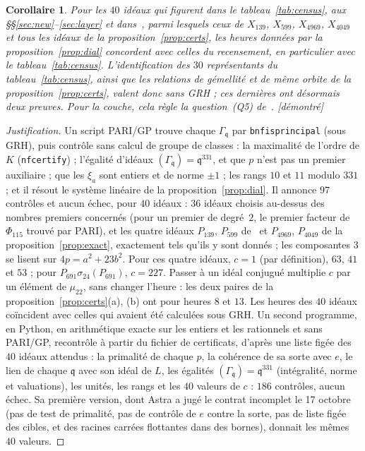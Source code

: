 \documentclass[11pt,a4paper]{amsart}
\theoremstyle{plain}
\newtheorem{corollary}[proposition]{Corollaire}
\theoremstyle{definition}
\newcommand{\q}{\mathfrak{q}}
\newcommand{\st}[1]{\textup{\textsf{\small[#1]}}}
\newcommand{\DEM}{\st{démontré}}
\begin{document}
\begin{corollary}\label{cor:dial}
Pour les $40$ idéaux qui figurent dans le tableau~\ref{tab:census}, aux \S\S\ref{sec:new}--\ref{sec:layer} et dans~\cite{Gau26}, parmi lesquels ceux de $X_{139}$, $X_{599}$, $X_{4969}$, $X_{4049}$ et tous les idéaux de la proposition~\ref{prop:certs}, les heures données par la proposition~\ref{prop:dial} concordent avec celles du recensement, en particulier avec le tableau~\ref{tab:census}. L'identification des $30$ représentants du tableau~\ref{tab:census}, ainsi que les relations de gémellité et de même orbite de la proposition~\ref{prop:certs}, valent donc sans GRH ; ces dernières ont désormais deux preuves. Pour la couche, cela règle la question~(Q5) de~\cite{Gau26}. \DEM
\end{corollary}

\begin{proof}[Justification]
Un script PARI/GP trouve chaque $\Gamma_\q$ par \texttt{bnfisprincipal} (sous GRH), puis contrôle sans calcul de groupe de classes : la maximalité de l'ordre de $K$ (\texttt{nfcertify}) ; l'égalité d'idéaux $(\Gamma_\q)=\q^{331}$, et que $p$ n'est pas un premier auxiliaire ; que les $\xi_a$ sont entiers et de norme $\pm1$ ; les rangs $10$ et $11$ modulo $331$ ; et il résout le système linéaire de la proposition~\ref{prop:dial}. Il annonce $97$ contrôles et aucun échec, pour $40$ idéaux : $36$ idéaux choisis au-dessus des nombres premiers concernés (pour un premier de degré~$2$, le premier facteur de $\Phi_{115}$ trouvé par PARI), et les quatre idéaux $P_{139}$, $P_{599}$ de~\cite{Gau26} et $P_{4969}$, $P_{4049}$ de la proposition~\ref{prop:exact}, exactement tels qu'ils y sont donnés ; les composantes $3$ se lisent sur $4p=a^2+23b^2$. Pour ces quatre idéaux, $c=1$ (par définition), $63$, $41$ et $53$ ; pour $P_{691}\sigma_{24}(P_{691})$, $c=227$. Passer à un idéal conjugué multiplie $c$ par un élément de $\mu_{22}$, sans changer l'heure : les deux paires de la proposition~\ref{prop:certs}(a), (b) ont pour heures $8$ et $13$. Les heures des $40$ idéaux coïncident avec celles qui avaient été calculées sous GRH. Un second programme, en Python, en arithmétique exacte sur les entiers et les rationnels et sans PARI/GP, recontrôle à partir du fichier de certificats, d'après une liste figée des $40$ idéaux attendus : la primalité de chaque $p$, la cohérence de sa sorte avec $e$, le lien de chaque $\q$ avec son idéal de $L$, les égalités $(\Gamma_\q)=\q^{331}$ (intégralité, norme et valuations), les unités, les rangs et les $40$ valeurs de $c$ : $186$ contrôles, aucun échec. Sa première version, dont Astra a jugé le contrat incomplet le 17 octobre (pas de test de primalité, pas de contrôle de $e$ contre la sorte, pas de liste figée des cibles, et des racines carrées flottantes dans des bornes), donnait les mêmes $40$ valeurs.
\end{proof}
\end{document}
